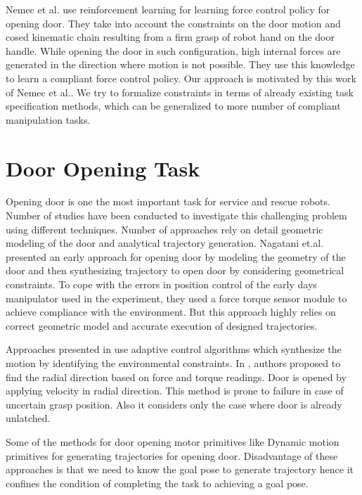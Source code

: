 \documentclass[thesis]{mas_proposal}
\begin{document}
Nemec et al. use reinforcement learning for learning force control policy for opening door\cite{nemec2017door}. They take into account the constraints on the door motion and cosed kinematic chain resulting from a firm grasp of robot hand on the door handle. While opening the door in such configuration, high internal forces are generated in the direction where motion is not possible. They use this knowledge to learn a compliant force control policy. Our approach is motivated by this work of Nemec et al.\cite{nemec2017door}. We try to formalize constraints in terms of already existing task specification methods, which can be generalized to more number of compliant manipulation tasks. 

\section{Door Opening Task}

Opening door is one the most important task for service and rescue robots. Number of studies have been conducted to investigate this challenging problem using different techniques. Number of approaches rely on detail geometric modeling of the door and analytical trajectory generation. Nagatani et.al. \cite{nagatani1995experiment} presented an early approach for opening door by modeling the geometry of the door and then synthesizing trajectory to open door by considering geometrical constraints. To cope with the errors in position control of the early days manipulator used in the experiment, they used a force torque sensor module to achieve compliance with the environment. But this approach highly relies on correct geometric model and accurate execution of designed trajectories.

Approaches presented in \cite{levihn2014using,karayiannidis2012adaptive,niemeyer1997simple} use adaptive control algorithms which synthesize the motion by identifying the environmental constraints. In \cite{karayiannidis2012adaptive}, authors proposed to find the radial direction based on force and torque readings. Door is opened by applying velocity in radial direction. This method is prone to failure in case of uncertain grasp position. Also it considers only the case where door is already unlatched. 

Some of the methods for door opening motor primitives like Dynamic motion primitives for generating trajectories for opening door. Disadvantage of these approaches is that we need to know the goal pose to generate trajectory hence it confines the condition of completing the task to achieving a goal pose. 
\end{document}
